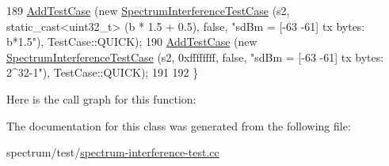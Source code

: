 \begin{DoxyCode}
189   \hyperlink{classns3_1_1TestCase_a3718088e3eefd5d6454569d2e0ddd835}{AddTestCase} (\textcolor{keyword}{new} \hyperlink{classSpectrumInterferenceTestCase}{SpectrumInterferenceTestCase} (s2, 
      static\_cast<uint32\_t> (b * 1.5 + 0.5), \textcolor{keyword}{false},   \textcolor{stringliteral}{"sdBm  = [-63 -61]  tx bytes: b*1.5"}), TestCase::QUICK);
190   \hyperlink{classns3_1_1TestCase_a3718088e3eefd5d6454569d2e0ddd835}{AddTestCase} (\textcolor{keyword}{new} \hyperlink{classSpectrumInterferenceTestCase}{SpectrumInterferenceTestCase} (s2, 0xffffffff, \textcolor{keyword}{
      false},     \textcolor{stringliteral}{"sdBm  = [-63 -61]  tx bytes: 2^32-1"}), TestCase::QUICK);
191 
192 \}
\end{DoxyCode}


Here is the call graph for this function\+:




The documentation for this class was generated from the following file\+:\begin{DoxyCompactItemize}
\item 
spectrum/test/\hyperlink{spectrum-interference-test_8cc}{spectrum-\/interference-\/test.\+cc}\end{DoxyCompactItemize}
